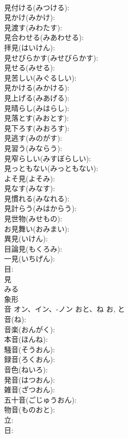 \documentclass[8pt]{extreport}
\begin{document}
\begin{CJK}{UTF8}{min}
\\	見付ける(みつける): 
\\	見かけ(みかけ): 
\\	見渡す(みわたす): 
\\	見合わせる(みあわせる): 
\\	拝見(はいけん): 
\\	見せびらかす(みせびらかす): 
\\	見せる(みせる): 
\\	見苦しい(みぐるしい): 
\\	見かける(みかける): 
\\	見上げる(みあげる): 
\\	見晴らし(みはらし): 
\\	見落とす(みおとす): 
\\	見下ろす(みおろす): 
\\	見逃す(みのがす): 
\\	見習う(みならう): 
\\	見窄らしい(みすぼらしい): 
\\	見っともない(みっともない): 
\\	よそ見(よそみ): 
\\	見なす(みなす): 
\\	見慣れる(みなれる): 
\\	見計らう(みはからう): 
\\	見世物(みせもの): 
\\	お見舞い(おみまい): 
\\	異見(いけん): 
\\	目論見(もくろみ): 
\\	一見(いちげん): 
\\	目: 
\\	見	
\\	みる	
\\	象形 
\\	音	オン、イン、-ノン	おと、ね	お, と	
\\	音(ね): 
\\	音楽(おんがく): 
\\	本音(ほんね): 
\\	騒音(そうおん): 
\\	録音(ろくおん): 
\\	音色(ねいろ): 
\\	発音(はつおん): 
\\	雑音(ざつおん): 
\\	五十音(ごじゅうおん): 
\\	物音(ものおと): 
\\	立: 
\\	日: 

\end{CJK}
\end{document}
